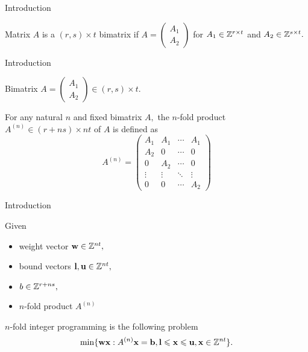 \documentclass[handout,usenames,dvipsnames]{beamer}
\begin{document}
\begin{frame}{Introduction}
    \begin{defi}[Bimatrix]
        Matrix $A$ is a $(r, s)\times t$ bimatrix if $A = \left(\begin{matrix}A_1 \\ A_2 \end{matrix}\right)$ for $A_1 \in \mathbb{Z}^{r \times t}$ and $A_2 \in \mathbb{Z}^{s \times t}.$
    \end{defi}
\end{frame}

\begin{frame}{Introduction}
    \begin{block}{Bimatrix}
        $A = \left(\begin{matrix}A_1 \\ A_2 \end{matrix}\right) \in (r,s) \times t.$
    \end{block}
    \pause
    \begin{defi}
        For any natural $n$ and fixed bimatrix $A,$ the $n$-fold product $A^{(n)} \in (r+ns) \times nt$ of $A$ is defined as
        $$
            A^{(n)} = \left(
                \begin{matrix}
                    A_1    & A_1    & \cdots & A_1    \\
                    A_2    & 0      & \cdots & 0      \\
                    0      & A_2    & \cdots & 0      \\
                    \vdots & \vdots & \ddots & \vdots \\
                    0      & 0      & \cdots & A_2
                \end{matrix}
            \right)
        $$
    \end{defi}
\end{frame}

\begin{frame}{Introduction}
    \begin{defi}
        Given 
        \begin{itemize}
            \item<1-> weight vector $\textbf{w} \in \mathbb{Z}^{nt},$
            
            \item<2-> bound vectors $\textbf{l}, \textbf{u} \in \mathbb{Z}^{nt},$
            
            \item<3-> $b \in \mathbb{Z}^{r+ns},$
            
            \item<4-> $n$-fold product $A^{(n)}$
        \end{itemize}
        $n$-fold integer programming is the following problem
        \begin{equation*}
            \min\{\textbf{w}\textbf{x} : A^{(n)}\textbf{x} = \textbf{b}, \textbf{l} \leqslant \textbf{x} \leqslant \textbf{u}, \textbf{x} \in \mathbb{Z}^{nt}\}.
        \end{equation*}
    \end{defi}
\end{frame}
\end{document}
